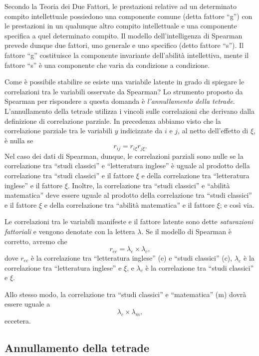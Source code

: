 Secondo la Teoria dei Due Fattori, le prestazioni relative ad un determinato compito intellettuale possiedono una componente comune (detta fattore ``g'') con le prestazioni in un qualunque altro compito intellettuale e una componente specifica a quel determinato compito.
Il modello dell'intelligenza di Spearman prevede dunque due fattori, uno generale e uno specifico (detto fattore ``s'').
Il fattore ``g'' costituisce la 
componente invariante dell'abilità intellettiva, mente il fattore ``s'' è una componente che varia da condizione a condizione. 

Come è possibile stabilire se esiste una variabile latente in grado di spiegare le correlazioni tra le variabili osservate da Spearman?
Lo strumento proposto da Spearman per rispondere a questa domanda è \textit{l'annullamento della tetrade}.
L'annullamento della tetrade utilizza i vincoli sulle correlazioni che derivano dalla definizione di correlazione parziale.
In precedenza abbiamo visto che la correlazione parziale tra le variabili $y$ indicizzate da $i$ e $j$, al netto dell'effetto di $\xi$, è nulla se
\[
r_{ij} = r_{i\xi}r_{j\xi}.
\]
Nel caso dei dati di Spearman, dunque, le correlazioni parziali sono nulle se 
la correlazione tra ``studi classici'' e ``letteratura inglese'' è uguale al prodotto della correlazione tra ``studi classici'' e il fattore $\xi$ e della correlazione tra ``letteratura inglese'' e il fattore $\xi$.
Inoltre, la correlazione tra ``studi classici'' e ``abilità matematica'' deve essere uguale al prodotto della correlazione tra ``studi classici'' e il fattore $\xi$ e della correlazione tra ``abilità matematica'' e il fattore $\xi$; e così via.

Le correlazioni tra le variabili manifeste e il fattore latente sono dette \textit{saturazioni fattoriali} e vengono denotate con la lettera $\lambda$.
  Se il modello di Spearman è corretto, avremo 
  che $$r_{ec}=\lambda_e \times \lambda_{c},$$ 
dove $r_{ec}$ è la correlazione tra ``letteratura inglese'' (e) e
``studi classici'' (c), $\lambda_e$ è la correlazione tra
``letteratura inglese'' e $\xi$, e $\lambda_{c}$ è la correlazione tra
``studi classici'' e $\xi$. 

Allo stesso modo, la correlazione tra ``studi classici'' e ``matematica'' (m) dovrà essere uguale a $$\lambda_c \times \lambda_m,$$ 
eccetera. 
 
\subsection{Annullamento della tetrade}

